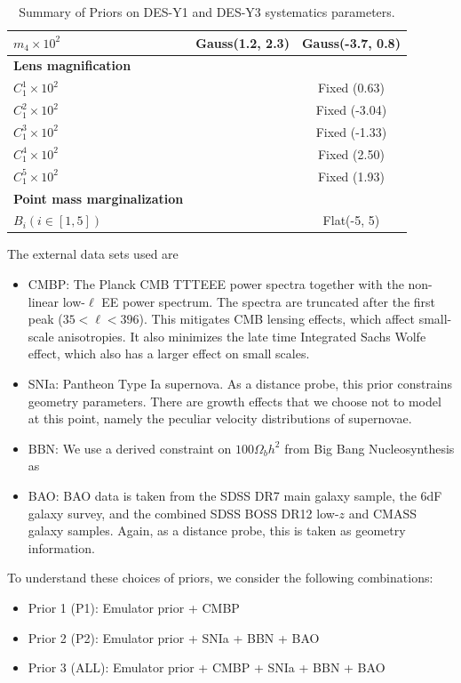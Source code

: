 \begin{table}
\begin{tabular}{lcc}
$m_{4} \times 10^2$ & Gauss(1.2, 2.3) & Gauss(-3.7, 0.8)\\
\hline
\textbf{Lens magnification} \\
$C_{\mathrm{1}}^1 \times 10^2$ & & Fixed (0.63)\\
$C_{\mathrm{1}}^2 \times 10^2$ & & Fixed (-3.04)\\
$C_{\mathrm{1}}^3 \times 10^2$ & & Fixed (-1.33)\\
$C_{\mathrm{1}}^4 \times 10^2$ & & Fixed (2.50)\\
$C_{\mathrm{1}}^5 \times 10^2$ & & Fixed (1.93)\\
\hline
\textbf{Point mass marginalization} \\
$B_i(i \in [1,5])$ & & Flat(-5, 5) \\
\hline
\end{tabular}
\caption{Summary of Priors on DES-Y1 and DES-Y3 systematics parameters.}
\label{table:prior_choices}
\end{table}
The external data sets used are
\begin{itemize}
	\item CMBP: The Planck CMB TTTEEE power spectra together with the non-linear low-$\ell$ EE power spectrum. The spectra are truncated after the first peak ($35<\ell<396$). This mitigates CMB lensing effects, which affect small-scale anisotropies. It also minimizes the late time Integrated Sachs Wolfe effect, which also has a larger effect on small scales.
	\item SNIa: Pantheon Type Ia supernova. As a distance probe, this prior constrains geometry parameters. There are growth effects that we choose not to model at this point, namely the peculiar velocity distributions of supernovae.
	\item BBN: We use a derived constraint on $100\Omega_bh^2$ from Big Bang Nucleosynthesis as
	\item BAO: BAO data is taken from the SDSS DR7 main galaxy sample, the 6dF galaxy survey, and the combined SDSS BOSS DR12 low-$z$ and CMASS galaxy samples. Again, as a distance probe, this is taken as geometry information.
\end{itemize}
To understand these choices of priors, we consider the following combinations:
\begin{itemize}
	\item Prior 1 (P1): Emulator prior + CMBP
	\item Prior 2 (P2): Emulator prior + SNIa + BBN + BAO
	\item Prior 3 (ALL): Emulator prior + CMBP + SNIa + BBN + BAO
\end{itemize}
